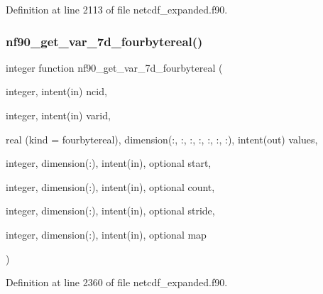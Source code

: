Definition at line 2113 of file netcdf\+\_\+expanded.\+f90.

\mbox{\label{netcdf__expanded_8f90_a7b7c4abd799cbfeebc5d7d8ccd84f484}} 
\subsubsection{\texorpdfstring{nf90\+\_\+get\+\_\+var\+\_\+7d\+\_\+fourbytereal()}{nf90\_get\_var\_7d\_fourbytereal()}}
{\footnotesize\ttfamily integer function nf90\+\_\+get\+\_\+var\+\_\+7d\+\_\+fourbytereal (\begin{DoxyParamCaption}\item[{integer, intent(in)}]{ncid,  }\item[{integer, intent(in)}]{varid,  }\item[{real (kind = fourbytereal), dimension(\+:, \+:, \+:, \+:, \+:, \+:, \+:), intent(out)}]{values,  }\item[{integer, dimension(\+:), intent(in), optional}]{start,  }\item[{integer, dimension(\+:), intent(in), optional}]{count,  }\item[{integer, dimension(\+:), intent(in), optional}]{stride,  }\item[{integer, dimension(\+:), intent(in), optional}]{map }\end{DoxyParamCaption})}



Definition at line 2360 of file netcdf\+\_\+expanded.\+f90.

\mbox{\label{netcdf__expanded_8f90_a7c46f83cf6857fc4db050cd9e89bd7f8}} 
